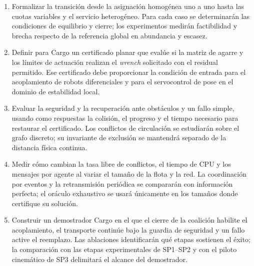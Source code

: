\begin{enumerate}[
  label=\textbf{OE\arabic*.},
  leftmargin=3.4em,
  topsep=0.4em,
  itemsep=0.55em,
  parsep=0pt
]

  \item Formalizar la transición desde la asignación homogénea uno a uno hasta
  las cuotas variables y el servicio heterogéneo. Para cada caso se determinarán
  las condiciones de equilibrio y cierre; los experimentos medirán factibilidad
  y brecha respecto de la referencia global en abundancia y escasez.

  \item Definir para Cargo un certificado planar que evalúe si la matriz de
  agarre y los límites de actuación realizan el \emph{wrench} solicitado con el
  residual permitido. Ese certificado debe proporcionar la condición de entrada
  para el acoplamiento de robots diferenciales y para el servocontrol de pose en
  el dominio de estabilidad local.

  \item Evaluar la seguridad y la recuperación ante obstáculos y un fallo
  simple, usando como respuestas la colisión, el progreso y el tiempo necesario
  para restaurar el certificado. Los conflictos de circulación se estudiarán
  sobre el grafo discreto; su invariante de exclusión se mantendrá separado de la
  distancia física continua.

  \item Medir cómo cambian la tasa libre de conflictos, el tiempo de CPU y los
  mensajes por agente al variar el tamaño de la flota y la red. La coordinación
  por eventos y la retransmisión periódica se compararán con información perfecta;
  el oráculo exhaustivo se usará únicamente en los tamaños donde certifique su
  solución.

  \item Construir un demostrador Cargo en el que el cierre de la coalición
  habilite el acoplamiento, el transporte continúe bajo la guardia de seguridad y
  un fallo active el reemplazo. Las ablaciones identificarán qué etapas sostienen
  el éxito; la comparación con las etapas experimentales de SP1--SP2 y con el
  piloto cinemático de SP3 delimitará el alcance del demostrador.

\end{enumerate}
